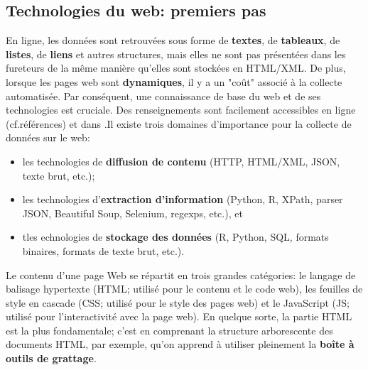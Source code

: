 \subsection{Technologies du web: premiers pas}
En ligne, les données sont retrouvées sous forme de \textbf{textes}, de \textbf{tableaux}, de \textbf{listes}, de \textbf{liens} et autres structures, mais elles ne sont pas présentées dans les fureteurs de la même manière qu'elles sont stockées en HTML/XML. De plus, lorsque les pages web sont \textbf{dynamiques}, il y a un "coût" associé à la collecte automatisée. Par conséquent, une connaissance de base du web et de ses technologies est cruciale. Des renseignements sont facilement accessibles en ligne (cf.\@ références) et dans \cite{DC_M,DC_MRMN}.\newpage\noindent Il existe trois domaines d'importance pour la collecte de données sur le web:
\begin{itemize}[noitemsep]
\item les technologies de \textbf{diffusion de contenu} (HTTP, HTML/XML, JSON, texte brut, etc.);
\item les technologies d'\textbf{extraction d'information} (Python, R, XPath, parser JSON, Beautiful Soup, Selenium, regexps, etc.), et 
\item tles echnologies de \textbf{stockage des données} (R, Python, SQL, formats binaires, formats de texte brut, etc.).
\end{itemize}
Le contenu d'une page Web se répartit en trois grandes catégories: le langage de balisage hypertexte (HTML; utilisé pour le contenu et le code web), les feuilles de style en cascade (CSS; utilisé pour le style des pages web) et le JavaScript (JS; utilisé pour l'interactivité avec la page web). En quelque sorte, la partie HTML est la plus fondamentale; c'est en comprenant la structure arborescente des documents HTML, par exemple, qu'on apprend à utiliser pleinement la \textbf{boîte à outils de grattage}. 
